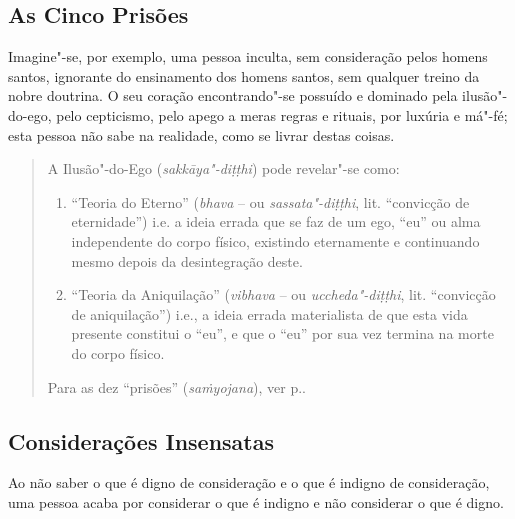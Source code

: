 
\subsection{As Cinco Prisões}


Imagine"-se, por exemplo, uma pessoa inculta, sem consideração pelos homens
santos, ignorante do ensinamento dos homens santos, sem qualquer treino da nobre
doutrina. O seu coração encontrando"-se possuído e dominado pela ilusão"-do-ego,
pelo cepticismo, pelo apego a meras regras e rituais, por luxúria e má"-fé; esta
pessoa não sabe na realidade, como se livrar destas coisas.


\clearpage

\begin{quote}
  A Ilusão"-do-Ego (\emph{sakkāya"-di\d{t}\d{t}hi}) pode revelar"-se como:

  \begin{enumerate}

    \item “Teoria do Eterno” (\emph{bhava} -- ou
          \emph{sassata"-di\d{t}\d{t}hi}, lit. “convicção de eternidade”) i.e.
          a ideia errada que se faz de um ego, “eu” ou alma independente
          do corpo físico, existindo eternamente e continuando mesmo depois da
          desintegração deste.

    \item “Teoria da Aniquilação” (\emph{vibhava} -- ou
          \emph{uccheda"-di\d{t}\d{t}hi}, lit. “convicção de aniquilação”)
          i.e., a ideia errada materialista de que esta vida presente constitui o
          “eu”, e que o “eu” por sua vez termina na morte do corpo físico.

  \end{enumerate}

  Para as dez “prisões” (\emph{sa\.{m}yojana}), ver p.\pageref{dez-prisoes}.
\end{quote}

\subsection{Considerações Insensatas}

Ao não saber o que é digno de consideração e o que é indigno de consideração,
uma pessoa acaba por considerar o que é indigno e não considerar o que é digno.

